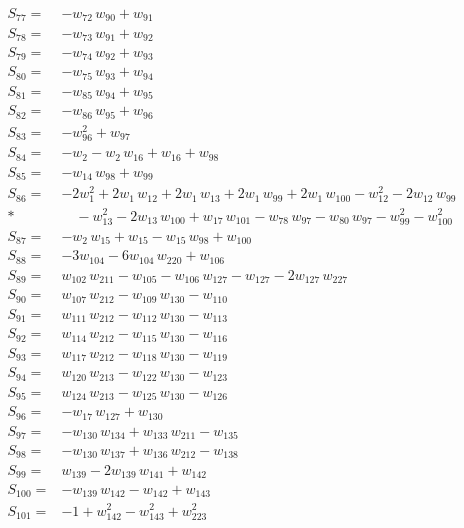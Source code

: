 \begin{align*}
S_{77}={}& -w_{72}\,w_{90} + w_{91} \\[2pt]
S_{78}={}& -w_{73}\,w_{91} + w_{92} \\[2pt]
S_{79}={}& -w_{74}\,w_{92} + w_{93} \\[2pt]
S_{80}={}& -w_{75}\,w_{93} + w_{94} \\[2pt]
S_{81}={}& -w_{85}\,w_{94} + w_{95} \\[2pt]
S_{82}={}& -w_{86}\,w_{95} + w_{96} \\[2pt]
S_{83}={}& -w_{96}^{2} + w_{97} \\[2pt]
S_{84}={}& -w_{2} - w_{2}\,w_{16} + w_{16} + w_{98} \\[2pt]
S_{85}={}& -w_{14}\,w_{98} + w_{99} \\[2pt]
S_{86}={}& -2w_{1}^{2} + 2w_{1}\,w_{12} + 2w_{1}\,w_{13} + 2w_{1}\,w_{99} + 2w_{1}\,w_{100} - w_{12}^{2} - 2w_{12}\,w_{99} \\*
&\quad  - w_{13}^{2} - 2w_{13}\,w_{100} + w_{17}\,w_{101} - w_{78}\,w_{97} - w_{80}\,w_{97} - w_{99}^{2} - w_{100}^{2} \\[2pt]
S_{87}={}& -w_{2}\,w_{15} + w_{15} - w_{15}\,w_{98} + w_{100} \\[2pt]
S_{88}={}& -3w_{104} - 6w_{104}\,w_{220} + w_{106} \\[2pt]
S_{89}={}& w_{102}\,w_{211} - w_{105} - w_{106}\,w_{127} - w_{127} - 2w_{127}\,w_{227} \\[2pt]
S_{90}={}& w_{107}\,w_{212} - w_{109}\,w_{130} - w_{110} \\[2pt]
S_{91}={}& w_{111}\,w_{212} - w_{112}\,w_{130} - w_{113} \\[2pt]
S_{92}={}& w_{114}\,w_{212} - w_{115}\,w_{130} - w_{116} \\[2pt]
S_{93}={}& w_{117}\,w_{212} - w_{118}\,w_{130} - w_{119} \\[2pt]
S_{94}={}& w_{120}\,w_{213} - w_{122}\,w_{130} - w_{123} \\[2pt]
S_{95}={}& w_{124}\,w_{213} - w_{125}\,w_{130} - w_{126} \\[2pt]
S_{96}={}& -w_{17}\,w_{127} + w_{130} \\[2pt]
S_{97}={}& -w_{130}\,w_{134} + w_{133}\,w_{211} - w_{135} \\[2pt]
S_{98}={}& -w_{130}\,w_{137} + w_{136}\,w_{212} - w_{138} \\[2pt]
S_{99}={}& w_{139} - 2w_{139}\,w_{141} + w_{142} \\[2pt]
S_{100}={}& -w_{139}\,w_{142} - w_{142} + w_{143} \\[2pt]
S_{101}={}& -1 + w_{142}^{2} - w_{143}^{2} + w_{223}^{2} \\[2pt]

\end{align*}
